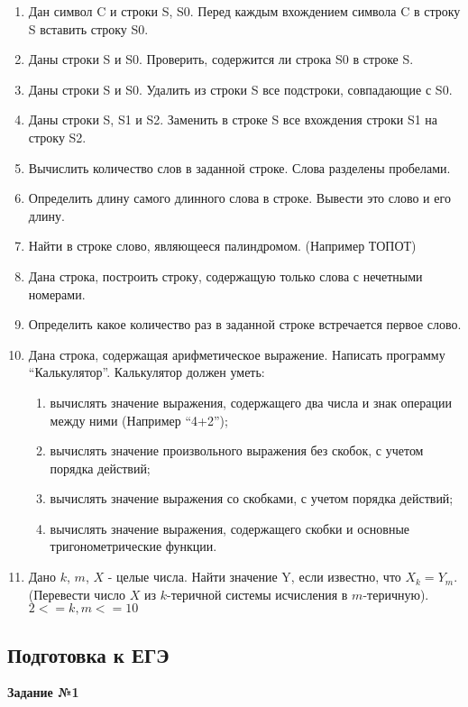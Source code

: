 \begin{enumerate}
  \item Дан символ C и строки S, S0. Перед каждым вхождением символа C в строку S вставить строку S0.
  \item Даны строки S и S0. Проверить, содержится ли строка S0 в строке S.
  \item Даны строки S и S0. Удалить из строки S все подстроки, совпадающие с S0.
  \item Даны строки S, S1 и S2. Заменить в строке S все вхождения строки S1 на строку S2.
  \item Вычислить количество слов в заданной строке. Слова разделены пробелами.
  \item Определить длину самого длинного слова в строке. Вывести это слово и его длину.
  \item Найти в строке слово, являющееся палиндромом. (Например ТОПОТ)
  \item Дана строка, построить строку, содержащую только слова с нечетными номерами.
  \item Определить какое количество раз в заданной строке встречается первое слово.
  \item Дана строка, содержащая арифметическое выражение. Написать программу “Калькулятор”. Калькулятор должен уметь:
     \begin{enumerate}
       \item вычислять значение выражения, содержащего два числа и знак операции между ними (Например “4+2”);
       \item вычислять значение произвольного выражения без скобок, с учетом порядка действий;
       \item вычислять значение выражения со скобками, с учетом порядка действий;
       \item вычислять значение выражения, содержащего скобки и основные тригонометрические функции.
     \end{enumerate}
  \item Дано $k$, $m$, $X$ - целые числа. Найти значение Y, если известно, что $X_k=Y_m$. (Перевести число $X$  из $k$-теричной системы исчисления в $m$-теричную). $2<=k,m<=10$
\end{enumerate}


\subsection{Подготовка к ЕГЭ}

{\bf Задание №1}

